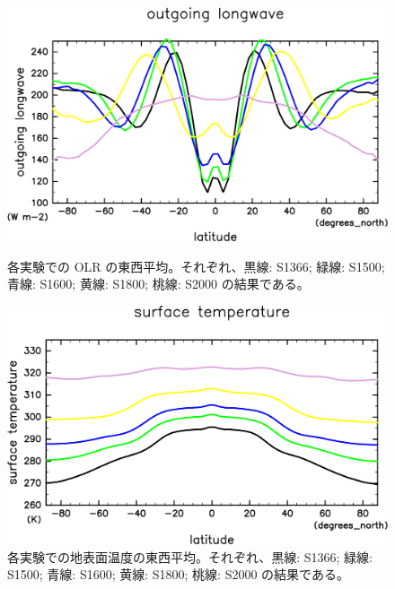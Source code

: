 \documentclass[body]{subfiles}
\begin{document}
\begin{figure}[t]
	\centering
	\begin{minipage}{.45\textwidth}
		\centering
		\includegraphics[width=\textwidth]{OLR-overplot-crop-rotate.pdf}
		\caption[各実験での OLR の東西平均]{
			各実験での OLR の東西平均。それぞれ、黒線: S1366;
			緑線: S1500; 青線: S1600; 黄線: S1800; 桃線: S2000 の結果である。
		}\label{OLR東西平均}
	\end{minipage}
	\hfill
	\begin{minipage}{.45\textwidth}
		\centering
		\includegraphics[width=\textwidth]{SurfTemp-overplot-crop-rotate.pdf}
		\caption[各実験での地表面温度の東西平均]{
			各実験での地表面温度の東西平均。それぞれ、黒線: S1366;
			緑線: S1500; 青線: S1600; 黄線: S1800; 桃線: S2000 の結果である。
		}\label{地表面温度}
	\end{minipage}
\end{figure}
\end{document}
